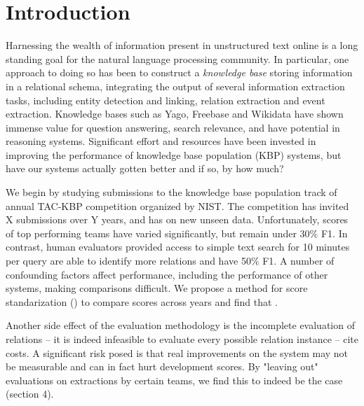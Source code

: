 \section{Introduction}
\label{sec:intro}

Harnessing the wealth of information present in unstructured text online is a long standing goal for the natural language processing community.
In particular, one approach to doing so has been to construct a \textit{knowledge base} storing information in a relational schema, integrating the output of several information extraction tasks, including entity detection and linking, relation extraction and event extraction.
Knowledge bases such as Yago, Freebase and Wikidata have shown immense value for question answering, search relevance, and have potential in reasoning systems\needcite.
Significant effort and resources have been invested in improving the performance of knowledge base population (KBP) systems, but have our systems actually gotten better and if so, by how much?

We begin by studying submissions to the knowledge base population track of annual TAC-KBP competition organized by NIST.\@
The competition has invited X submissions over Y years, and has on new unseen data.
Unfortunately, scores of top performing teams have varied significantly, but remain under 30\% F1.
In contrast, human evaluators provided access to simple text search for 10 minutes per query are able to identify more relations and have 50\% F1.
A number of confounding factors affect performance, including the performance of other systems, making comparisons difficult.
We propose a method for score standarization () to compare scores across years and find that .

Another side effect of the evaluation methodology is the incomplete evaluation of relations -- it is indeed infeasible to evaluate every possible relation instance -- cite costs.
A significant risk posed is that real improvements on the system may not be measurable and can in fact hurt development scores. By "leaving out" evaluations on extractions by certain teams, we find this to indeed be the case (section 4).

